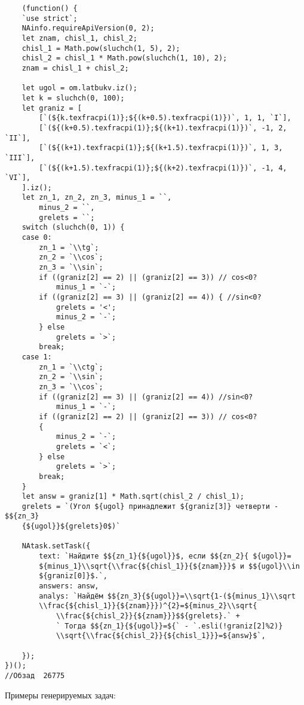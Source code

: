 \vspace{\baselineskip}
\vspace{\baselineskip}

\begin{lstlisting}
	(function() {
	`use strict`;
	NAinfo.requireApiVersion(0, 2);
	let znam, chisl_1, chisl_2;
	chisl_1 = Math.pow(sluchch(1, 5), 2);
	chisl_2 = chisl_1 * Math.pow(sluchch(1, 10), 2);
	znam = chisl_1 + chisl_2;

	let ugol = om.latbukv.iz();
	let k = sluchch(0, 100);
	let graniz = [
		[`(${k.texfracpi(1)};${(k+0.5).texfracpi(1)})`, 1, 1, `I`],
		[`(${(k+0.5).texfracpi(1)};${(k+1).texfracpi(1)})`, -1, 2, `II`],
		[`(${(k+1).texfracpi(1)};${(k+1.5).texfracpi(1)})`, 1, 3, `III`],
		[`(${(k+1.5).texfracpi(1)};${(k+2).texfracpi(1)})`, -1, 4, `VI`],
	].iz();
	let zn_1, zn_2, zn_3, minus_1 = ``,
		minus_2 = ``,
		grelets = ``;
	switch (sluchch(0, 1)) { 
	case 0:
		zn_1 = `\\tg`;
		zn_2 = `\\cos`;
		zn_3 = `\\sin`;
		if ((graniz[2] == 2) || (graniz[2] == 3)) // cos<0? 
			minus_1 = `-`;
		if ((graniz[2] == 3) || (graniz[2] == 4)) { //sin<0?
			grelets = '<';
			minus_2 = `-`;
		} else
			grelets = `>`;
		break;
	case 1:
		zn_1 = `\\ctg`;
		zn_2 = `\\sin`;
		zn_3 = `\\cos`;
		if ((graniz[2] == 3) || (graniz[2] == 4)) //sin<0?
			minus_1 = `-`;
		if ((graniz[2] == 2) || (graniz[2] == 3)) // cos<0?
		{
			minus_2 = `-`;
			grelets = `<`;
		} else
			grelets = `>`;
		break;
	}
	let answ = graniz[1] * Math.sqrt(chisl_2 / chisl_1);
	grelets = `(Угол ${ugol} принадлежит ${graniz[3]} четверти - $${zn_3}
	{${ugol}}${grelets}0$)`

	NAtask.setTask({
		text: `Найдите $${zn_1}{${ugol}}$, если $${zn_2}{ ${ugol}}=
		${minus_1}\\sqrt{\\frac{${chisl_1}}{${znam}}}$ и $${ugol}\\in 
		${graniz[0]}$.`,
		answers: answ,
		analys: `Найдём $${zn_3}{${ugol}}=\\sqrt{1-(${minus_1}\\sqrt
		\\frac{${chisl_1}}{${znam}}})^{2}=${minus_2}\\sqrt{
			\\frac{${chisl_2}}{${znam}}}$${grelets}.` +
			` Тогда $${zn_1}{${ugol}}=${` - `.esli(!graniz[2]%2)}
			\\sqrt{\\frac{${chisl_2}}{${chisl_1}}}=${answ}$`,

	});
})();
//Обзад  26775
\end{lstlisting}
Примеры генерируемых задач:

